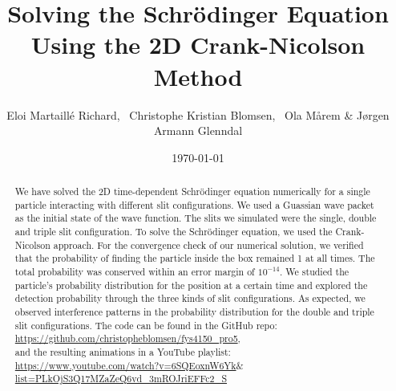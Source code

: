 \documentclass[english,notitlepage,reprint,nofootinbib]{revtex4-2}  %
\begin{document}
	
	\title{\Huge{Solving the Schrödinger Equation Using the 2D Crank-Nicolson Method}}  %
	\author{Eloi Martaillé Richard,
	\
	Christophe Kristian Blomsen,
	\
	Ola Mårem
	\&
	Jørgen Armann Glenndal
    }
	\date{\today}                             %
	\noaffiliation                            %
	
	\begin{abstract}
	We have solved the 2D time-dependent Schrödinger equation numerically for a single particle
	interacting with different slit configurations. We used a Guassian wave packet as the initial state of the wave function.
	The slits we simulated were the single, double and triple slit configuration.
	To solve the Schrödinger equation, we used the
	Crank-Nicolson approach. For the convergence check of our numerical solution, we verified that the probability of finding the particle inside the box remained 1 at all times. The total probability was conserved within an
	error margin of  $10^{-14}$. We studied the particle's probability distribution for the position at a certain time and explored the detection probability through the three kinds of slit configurations. As expected, we observed interference patterns in the probability distribution for the double and triple slit configurations.
	The code can be found in the GitHub repo:		\href{https://github.com/christopheblomsen/fys4150_pro5}{https://github.com/christopheblomsen/fys4150\_pro5}, 
	\\and the resulting animations in a YouTube playlist: \\
	\href{https://www.youtube.com/watch?v=6SQEoxnW6Yk&list=PLkOjS3Q17MZaZeQ6vd_3mROJriEFFc2_S }{https://www.youtube.com/watch?v=6SQEoxnW6Yk$\&$list=PLkOjS3Q17MZaZeQ6vd\_3mROJriEFFc2\_S}

\end{abstract}
	\maketitle	
	
	
\end{document}

